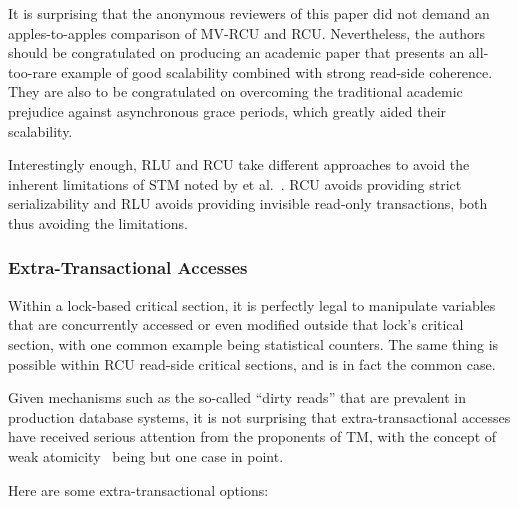 {	It is surprising that the anonymous reviewers of this paper did
	not demand an apples-to-apples comparison of MV-RCU and RCU\@.
	Nevertheless, the authors should be congratulated on producing
	an academic paper that presents an all-too-rare example of good
	scalability combined with strong read-side coherence.
	They are also to be congratulated on overcoming the traditional
	academic prejudice against asynchronous grace periods,
	which greatly aided their scalability.

	Interestingly enough, RLU and RCU take different approaches to avoid
	the inherent limitations of STM noted by  et
	al.~\cite{Attiya:2009:STMReadOnlyLimits}.
	RCU avoids providing strict serializability and RLU avoids providing
	invisible read-only transactions, both thus avoiding the
	limitations.
}\QuickQuizEnd

\subsubsection{Extra-Transactional Accesses}
\label{sec:future:Extra-Transactional Accesses}

Within a lock-based critical section, it is perfectly legal to manipulate
variables that are concurrently accessed or even modified outside that
lock's critical section, with one common example being statistical
counters.
The same thing is possible within RCU read-side critical
sections, and is in fact the common case.

Given mechanisms such as the so-called ``dirty reads'' that are
prevalent in production database systems, it is not surprising
that extra-transactional accesses have received serious attention
from the proponents of TM, with the concept of weak
atomicity~\cite{Blundell2006TMdeadlock} being but one case in point.

Here are some extra-transactional options:


